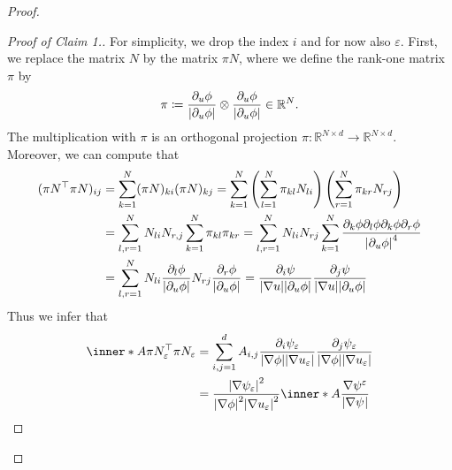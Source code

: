 \begin{proof}
	\begin{proof}[Proof of Claim 1.]
		For simplicity, we drop the index $ i $ and for now also $ \varepsilon 
		$.
		First, we replace the matrix $ N $ by the matrix $ \pi N $, where we 
		define the rank-one matrix $ \pi $ by
		\begin{equation*}
			\pi 
			\coloneqq
			\frac{ \partial_{ u } \phi }{ \abs{ \partial_{ u } \phi } }
			\otimes
			\frac{ \partial_{ u } \phi }{ \abs{ \partial_{ u } \phi } }
			\in 
			\mathbb{ R }^{ N }.
		\end{equation*}
		The multiplication with $ \pi $ is an orthogonal projection $ \pi 
		\colon \mathbb{ R }^{ N \times d } \to \mathbb{ R }^{ N \times d } $. 
		Moreover, we can compute that
		\begin{align*}
			( \pi N^{ \top } \pi N )_{ i j }
			& =
			\sum_{ k = 1 }^{ N }
				( \pi N )_{ k i }
				( \pi N )_{ k j }
			=
			\sum_{ k = 1 }^{ N }
				\left(
					\sum_{ l = 1 }^{ N }
						\pi_{ k l } N_{ l i }
				\right)
				\left(
					\sum_{ r = 1 }^{ N }
						\pi_{ k r } N_{ r j }
				\right)
			\\
			& =
			\sum_{ l, r = 1 }^{ N }
				N_{ l i } N_{ r , j }
				\sum_{ k = 1 }^{ N }
					\pi_{ k l }
					\pi_{ k r }
			=
			\sum_{ l, r = 1 }^{ N }
				N_{ l i }N_{ r j }
				\sum_{ k = 1 }^{ N }
					\frac{ \partial_{ k } \phi  \partial_{ l } \phi \partial_{ 
					k } \phi \partial_{ r } \phi }{ \abs{ \partial_{ u } \phi 
					}^{ 4 } }
			\\
			& =
			\sum_{ l, r = 1 }^{ N }
				N_{ l i } \frac{ \partial_{ l } \phi }{ \abs{ \partial_{ u } 
				\phi } }
				N_{ r j } \frac{ \partial_{ r } \phi }{ \abs{ \partial_{ u } 
				\phi } }
			=
			\frac{ \partial_{ i } \psi }{ \abs{ \nabla u } \abs{ \partial_{ u } 
			\phi } }
			\frac{ \partial_{ j } \psi }{ \abs{ \nabla u } \abs{ \partial_{ u } 
			\phi } }
		\end{align*}
		Thus we infer that
		\begin{align*}
			\inner*{ A }{ \pi N_{ \varepsilon }^{ \top } \pi N_{ \varepsilon } }
			& =
			\sum_{ i, j = 1 }^{ d }
				A_{ i , j } 
				\frac{ \partial_{ i } \psi_{ \varepsilon } }{ \abs{ \nabla \phi 
				} \abs{ \nabla u_{ \varepsilon } } }
				\frac{ \partial_{ j } \psi_{ \varepsilon } }{ \abs{ \nabla \phi 
				} \abs{ \nabla u_{ \varepsilon } } }
			\\
			& =
			\frac{ \abs{ \nabla \psi_{ \varepsilon } }^{ 2 } }{ \abs{ \nabla 
			\phi }^{ 2 } \abs{ \nabla u_{ \varepsilon } }^{ 2 } }
			\inner*{ A }
			{ \frac{ \nabla \psi^{ \varepsilon } }{ \abs{ \nabla \psi^{ 
}}}}
\end{align*}
\end{proof}
\end{proof}
